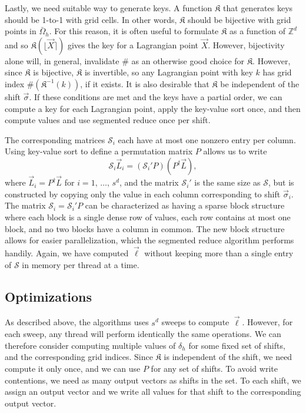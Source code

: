 Lastly, we need suitable way to generate keys. A function $\mathfrak{K}$ that
generates keys should be 1-to-1 with grid cells. In other words, $\mathfrak{K}$
should be bijective with grid points in $\bar{\Omega}_h$. For this reason, it
is often useful to formulate $\mathfrak{K}$ as a function of $\mathbb{Z}^d$ and
so $\mathfrak{K}(\lfloor\vec{X}\rceil)$ gives the key for a Lagrangian point
$\vec{X}$. However, bijectivity alone will, in general, invalidate $\#$ as an
otherwise good choice for $\mathfrak{K}$. However, since $\mathfrak{K}$ is
bijective, $\mathfrak{K}$ is invertible, so any Lagrangian point with key $k$
has grid index $\#(\mathfrak{K}^{-1}(k))$, if it exists. It is also desirable
that $\mathfrak{K}$ be independent of the shift $\vec{\sigma}$. If these
conditions are met and the keys have a partial order, we can compute a key for
each Lagrangian point, apply the key-value sort once, and then compute values
and use segmented reduce once per shift.

The corresponding matrices $\mathcal{S}_i$ each have at most one nonzero entry
per column. Using key-value sort to define a permutation matrix $P$ allows us
to write
\begin{equation}
    \label{eq:submatrix}
    \mathcal{S}_i\vec{L}_i = (\mathcal{S}_i'P)(P^\dagger\vec{L}),
\end{equation}
where $\vec{L}_i=P^\dagger\vec{L}$ for $i=1,\,\ldots,\,s^d$, and the matrix
$\mathcal{S}_i'$ is the same size as $\mathcal{S}$, but is constructed by
copying only the value in each column corresponding to shift $\vec{\sigma}_i$.
The matrix $\mathcal{S}_i=\mathcal{S}_i'P$ can be characterized as having
a sparse block structure where each block is a single dense row of values, each
row contains at most one block, and no two blocks have a column in common. The
new block structure allows for easier parallelization, which the segmented
reduce algorithm performs handily. Again, we have computed $\vec{\ell}$ without
keeping more than a single entry of $\mathcal{S}$ in memory per thread at a
time.

\subsection{Optimizations}
As described above, the algorithms uses $s^d$ sweeps to compute $\vec{\ell}$.
However, for each sweep, any thread will perform identically the same
operations. We can therefore consider computing multiple values of $\delta_h$
for some fixed set of shifts, and the corresponding grid indices. Since
$\mathfrak{K}$ is independent of the shift, we need compute it only once, and
we can use $P$ for any set of shifts. To avoid write contentions, we need as
many output vectors as shifts in the set. To each shift, we assign an output
vector and we write all values for that shift to the corresponding output
vector.

